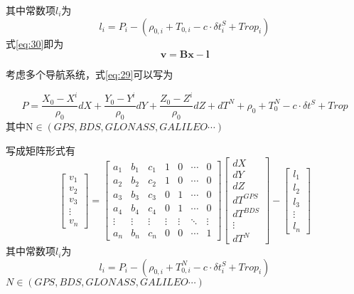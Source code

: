 \documentclass{ctexart}
\begin{document}
其中常数项$l_i$为
\begin{equation}
l_i=P_i-(\rho_{0,i}+T_{0,i}-c\cdot\delta t^S_i+Trop_i)
\end{equation}
式\eqref{eq:30}即为
\begin{equation}
\mathbf{v}=\mathbf{B}\mathbf{x}-\mathbf{l}
\label{eq:32}
\end{equation}

考虑多个导航系统，式\eqref{eq:29}可以写为

\begin{equation}
P=\frac{X_0-X^i}{\rho_0}dX+\frac{Y_0-Y^i}{\rho_0}dY+\frac{Z_0-Z^i}{\rho_0}dZ+dT^N+\rho_0+T^N_0 - c\cdot\delta t^S+Trop
\label{eq:33}
\end{equation}
其中N$\in(GPS,BDS,GLONASS,GALILEO\cdots)$

写成矩阵形式有
\begin{equation}
\begin{bmatrix}
v_1\\
v_2\\
v_3\\
\vdots\\
v_n
\end{bmatrix}=\begin{bmatrix}
a_1&b_1&c_1&1&0&\cdots&0\\
a_2&b_2&c_2&1&0&\cdots&0\\
a_3&b_3&c_3&0&1&\cdots&0\\
a_4&b_4&c_4&0&1&\cdots&0\\
\vdots&\vdots&\vdots&\vdots&\vdots&\ddots&\vdots\\
a_n&b_n&c_n&0&0&\cdots&1
\end{bmatrix}\begin{bmatrix}
dX\\
dY\\
dZ\\
dT^{GPS}\\
dT^{BDS}\\
\vdots\\
dT^{N}
\end{bmatrix}-\begin{bmatrix}
l_1\\
l_2\\
l_3\\
\vdots\\
l_n
\end{bmatrix}
\label{eq:34}
\end{equation}
其中常数项$l_i$为
\begin{equation}
l_i=P_i-(\rho_{0,i}+T^N_{0,i}-c\cdot\delta t^S_i+Trop_i)
\end{equation}
$N\in(GPS,BDS,GLONASS,GALILEO\cdots)$
\end{document}
